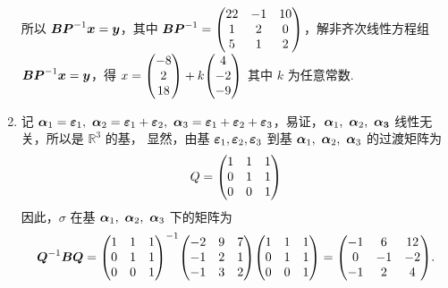 \begin{solution}
\begin{enumerate}[label=(\arabic{*})]
              所以 $\vb*{BP}^{-1}\vb*{x}=\vb*{y}$，其中 $\vb*{BP}^{-1}=\mqty(22&-1&10\\1&2&0\\5&1&2)$，解非齐次线性方程组 $\vb*{BP}^{-1}\vb*{x}=\vb*{y}$，得 $x=\mqty(-8\\2\\18)+k\mqty(4\\-2\\-9)$ 其中 $k$ 为任意常数.
        \item 记 $\vb*{\alpha}_1=\vb*{\varepsilon}_1,~\vb*{\alpha}_2=\vb*{\varepsilon}_1+\vb*{\varepsilon}_2,~\vb*{\alpha}_3=\vb*{\varepsilon}_1+\vb*{\varepsilon}_2+\vb*{\varepsilon}_3$，易证，$\vb*{\alpha}_1,~\vb*{\alpha}_2,~\vb*{\alpha_3}$ 线性无关，所以是 $\mathbb{R}^3$ 的基，
              显然，由基 $\vb*{\varepsilon}_1,\vb*{\varepsilon}_2,\vb*{\varepsilon}_3$ 到基 $\vb*{\alpha}_1,~\vb*{\alpha}_2,~\vb*{\alpha}_3$ 的过渡矩阵为 $$Q=\mqty(1&1&1\\0&1&1\\0&0&1)$$
              因此，$\sigma$ 在基 $\vb*{\alpha}_1,~\vb*{\alpha}_2,~\vb*{\alpha}_3$ 下的矩阵为
              $$\vb*{Q}^{-1}\vb*{BQ}=\mqty(1&1&1\\0&1&1\\0&0&1)^{-1}\mqty(-2&9&7\\-1&2&1\\-1&3&2)\mqty(1&1&1\\0&1&1\\0&0&1)=\mqty(-1&6&12\\0&-1&-2\\-1&2&4).$$
    \end{enumerate}
\end{solution}
